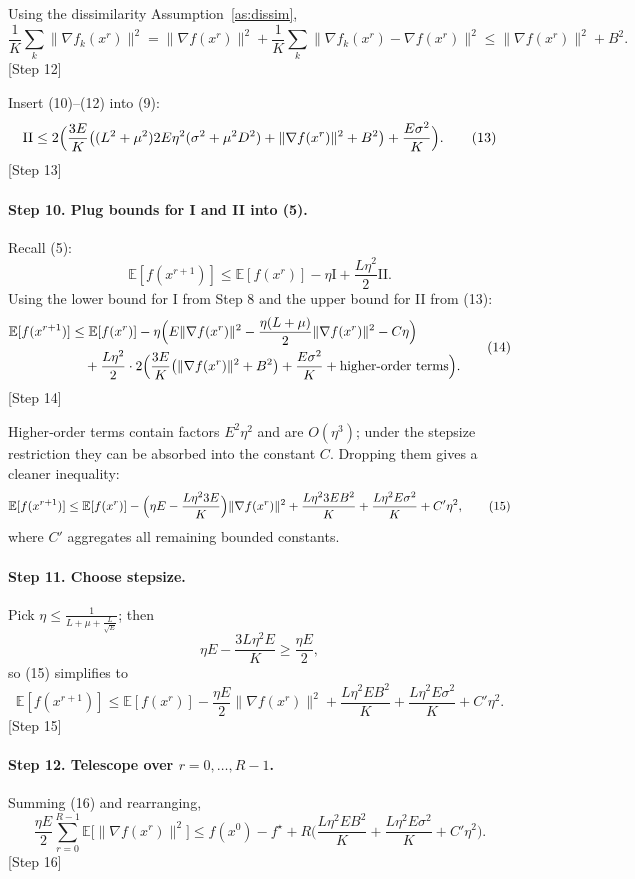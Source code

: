 \documentclass{article}
\newcommand{\E}{\mathbb{E}}
\begin{document}
Using the dissimilarity Assumption~\ref{as:dissim},
\[
\frac{1}{K}\sum_{k}\|\nabla f_k(x^{r})\|^{2}
= \|\nabla f(x^{r})\|^{2}+ \frac{1}{K}\sum_{k}\|\nabla f_k(x^{r})-\nabla f(x^{r})\|^{2}
\le \|\nabla f(x^{r})\|^{2}+B^{2}.
\tag{12}
\]
[Step 12]

Insert (10)–(12) into (9):
\[
\text{II}\le
2\Bigl(\frac{3E}{K}\bigl((L^{2}+\mu^{2})2E\eta^{2}(\sigma^{2}+\mu^{2}D^{2})+ \|\nabla f(x^{r})\|^{2}+B^{2}\bigr)
      +\frac{E\sigma^{2}}{K}\Bigr).
\tag{13}
\]
[Step 13]

\paragraph{Step 10. Plug bounds for I and II into (5).}
Recall (5):
\[
\E[f(x^{r+1})]\le \E[f(x^{r})]
-\eta\text{I}
+\frac{L\eta^{2}}{2}\text{II}.
\]
Using the lower bound for I from Step 8 and the upper bound for II from (13):
\[
\begin{aligned}
\E[f(x^{r+1})]
&\le \E[f(x^{r})]
-\eta\Bigl(E\|\nabla f(x^{r})\|^{2}
-\frac{\eta(L+\mu)}{2}\|\nabla f(x^{r})\|^{2}
-C\eta\Bigr)\\
&\quad+\frac{L\eta^{2}}{2}\cdot 2\Bigl(\frac{3E}{K}\bigl(\|\nabla f(x^{r})\|^{2}+B^{2}\bigr)
      +\frac{E\sigma^{2}}{K}+ \text{higher‑order terms}\Bigr).
\end{aligned}
\tag{14}
\]
[Step 14]

Higher‑order terms contain factors $E^{2}\eta^{2}$ and are $O(\eta^{3})$; under the stepsize restriction they can be absorbed into the constant $C$. Dropping them gives a cleaner inequality:
\[
\E[f(x^{r+1})]\le \E[f(x^{r})]
-\Bigl(\eta E-\frac{L\eta^{2}3E}{K}\Bigr)\|\nabla f(x^{r})\|^{2}
+ \frac{L\eta^{2}3E B^{2}}{K}
+ \frac{L\eta^{2}E\sigma^{2}}{K}
+ C'\eta^{2},
\tag{15}
\]
where $C'$ aggregates all remaining bounded constants.

\paragraph{Step 11. Choose stepsize.}
Pick $\eta\le \frac{1}{L+\mu+\frac{L}{\sqrt{E}}}$; then
\[
\eta E-\frac{3L\eta^{2}E}{K}\ge \frac{\eta E}{2},
\]
so (15) simplifies to
\[
\E[f(x^{r+1})]\le \E[f(x^{r})]
-\frac{\eta E}{2}\|\nabla f(x^{r})\|^{2}
+ \frac{L\eta^{2}E B^{2}}{K}
+ \frac{L\eta^{2}E\sigma^{2}}{K}
+ C'\eta^{2}.
\tag{16}
\]
[Step 15]

\paragraph{Step 12. Telescope over $r=0,\dots,R-1$.}
Summing (16) and rearranging,
\[
\frac{\eta E}{2}\sum_{r=0}^{R-1}\E\!\bigl[\|\nabla f(x^{r})\|^{2}\bigr]
\le f(x^{0})-f^{\star}
+R\bigl(\frac{L\eta^{2}E B^{2}}{K}+\frac{L\eta^{2}E\sigma^{2}}{K}+C'\eta^{2}\bigr).
\tag{17}
\]
[Step 16]
\end{document}
